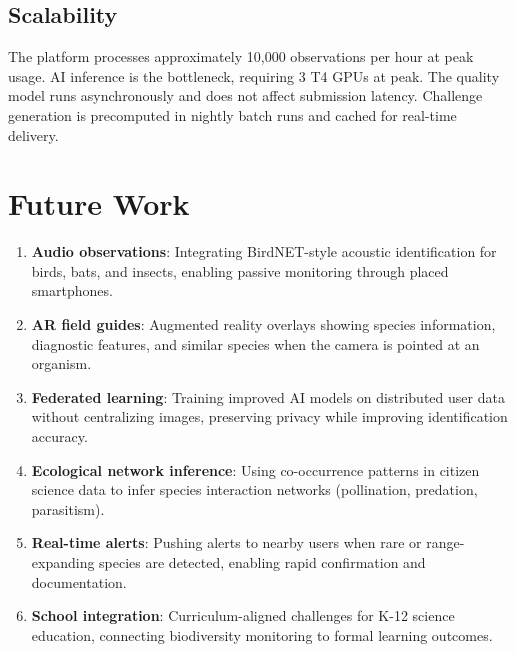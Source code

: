 \documentclass[11pt,a4paper]{article}
\begin{document}
\subsection{Scalability}

The platform processes approximately 10{,}000 observations per hour at
peak usage. AI inference is the bottleneck, requiring 3 T4 GPUs at peak.
The quality model runs asynchronously and does not affect submission
latency. Challenge generation is precomputed in nightly batch runs and
cached for real-time delivery.


\section{Future Work}
\label{sec:future}

\begin{enumerate}
  \item \textbf{Audio observations}: Integrating BirdNET-style acoustic
    identification for birds, bats, and insects, enabling passive
    monitoring through placed smartphones.

  \item \textbf{AR field guides}: Augmented reality overlays showing
    species information, diagnostic features, and similar species when
    the camera is pointed at an organism.

  \item \textbf{Federated learning}: Training improved AI models on
    distributed user data without centralizing images, preserving
    privacy while improving identification accuracy.

  \item \textbf{Ecological network inference}: Using co-occurrence
    patterns in citizen science data to infer species interaction
    networks (pollination, predation, parasitism).

  \item \textbf{Real-time alerts}: Pushing alerts to nearby users
    when rare or range-expanding species are detected, enabling rapid
    confirmation and documentation.

  \item \textbf{School integration}: Curriculum-aligned challenges for
    K-12 science education, connecting biodiversity monitoring to
    formal learning outcomes.
\end{enumerate}
\end{document}
